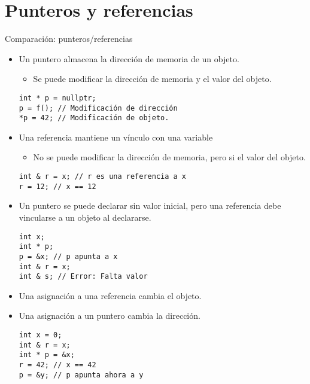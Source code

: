 \section{Punteros y referencias}

\begin{frame}[fragile]{Comparación: punteros/referencias}
\begin{itemize}
  \item Un puntero almacena la dirección de memoria de un objeto.
    \begin{itemize}
      \item Se puede modificar la dirección de memoria y el valor del objeto.
    \end{itemize}
\begin{lstlisting}
int * p = nullptr; 
p = f(); // Modificación de dirección
*p = 42; // Modificación de objeto.
\end{lstlisting}
  \item Una referencia mantiene un vínculo con una variable
    \begin{itemize}
      \item No se puede modificar la dirección de memoria, pero si el valor del objeto.
    \end{itemize}
\begin{lstlisting}
int & r = x; // r es una referencia a x
r = 12; // x == 12
\end{lstlisting}
\end{itemize}
\end{frame}

\begin{frame}[fragile]
\begin{itemize}
  \item Un puntero se puede declarar sin valor inicial, pero una referencia debe vincularse
        a un objeto al declararse.
\begin{lstlisting}
int x;
int * p;
p = &x; // p apunta a x
int & r = x;
int & s; // Error: Falta valor
\end{lstlisting}
  \item Una asignación a una referencia cambia el objeto.
  \item Una asignación a un puntero cambia la dirección.
\begin{lstlisting}
int x = 0;
int & r = x;
int * p = &x;
r = 42; // x == 42
p = &y; // p apunta ahora a y
\end{lstlisting}
\end{itemize}
\end{frame}
